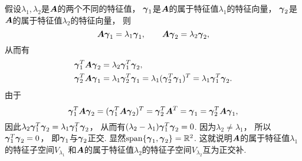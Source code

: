 假设\(\lambda_1,\lambda_2\)是\(\boldsymbol{A}\)的两个不同的特征值，
\(\boldsymbol\gamma_1\)是\(\boldsymbol{A}\)的属于特征值\(\lambda_1\)的特征向量，
\(\boldsymbol\gamma_2\)是\(\boldsymbol{A}\)的属于特征值\(\lambda_2\)的特征向量，
则\begin{equation*}
	\boldsymbol{A} \boldsymbol\gamma_1 = \lambda_1 \boldsymbol\gamma_1,
	\qquad
	\boldsymbol{A} \boldsymbol\gamma_2 = \lambda_2 \boldsymbol\gamma_2,
\end{equation*}
从而有\begin{align*}
	\boldsymbol\gamma_1^T \boldsymbol{A} \boldsymbol\gamma_2 &= \lambda_2 \boldsymbol\gamma_1^T \boldsymbol\gamma_2, \\
	\boldsymbol\gamma_2^T \boldsymbol{A} \boldsymbol\gamma_1 &= \lambda_1 \boldsymbol\gamma_2^T \boldsymbol\gamma_1
									= \lambda_1 (\boldsymbol\gamma_2^T \boldsymbol\gamma_1)^T
									= \lambda_1 \boldsymbol\gamma_1^T \boldsymbol\gamma_2.
\end{align*}
由于\begin{equation*}
	\boldsymbol\gamma_1^T \boldsymbol{A} \boldsymbol\gamma_2
	= (\boldsymbol\gamma_1^T \boldsymbol{A} \boldsymbol\gamma_2)^T
	= \boldsymbol\gamma_2^T \boldsymbol{A}^T = \boldsymbol\gamma_1
	= \boldsymbol\gamma_2^T \boldsymbol{A} \boldsymbol\gamma_1,
\end{equation*}
因此\(
	\lambda_2 \boldsymbol\gamma_1^T \boldsymbol\gamma_2
	= \lambda_1 \boldsymbol\gamma_1^T \boldsymbol\gamma_2
\)，
从而有\(
	(\lambda_2 - \lambda_1) \boldsymbol\gamma_1^T \boldsymbol\gamma_2 = 0
\).
因为\(\lambda_2 \neq \lambda_1\)，
所以\(\boldsymbol\gamma_1^T \boldsymbol\gamma_2 = 0\)，
即\(\boldsymbol\gamma_1\)与\(\boldsymbol\gamma_2\)正交.
显然\(\operatorname{span}\{\boldsymbol\gamma_1,\boldsymbol\gamma_2\} = \mathbb{R}^2\).
这就说明\(\boldsymbol{A}\)的属于特征值\(\lambda_1\)的特征子空间\(V_{\lambda_1}\)
和\(\boldsymbol{A}\)的属于特征值\(\lambda_2\)的特征子空间\(V_{\lambda_2}\)互为正交补.

